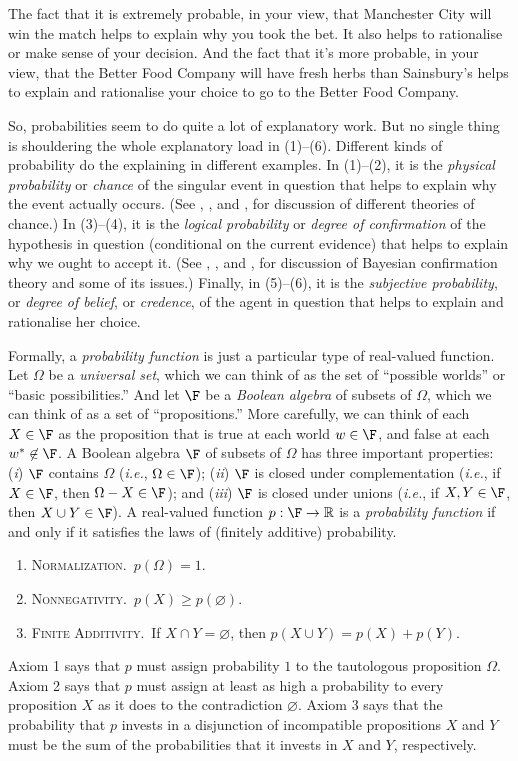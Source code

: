 The fact that it is extremely probable, in your view, that Manchester City will win the match helps to explain why you took the bet. It also helps to rationalise or make sense of your decision. And the fact that it's more probable, in your view, that the Better Food Company will have fresh herbs than Sainsbury's helps to explain and rationalise your choice to go to the Better Food Company.

So, probabilities seem to do quite a lot of explanatory work. But no single thing is shouldering the whole explanatory load in (1)--(6). Different kinds of probability do the explaining in different examples. In (1)--(2), it is the \emph{physical probability} or \emph{chance} of the singular event in question that helps to explain why the event actually occurs. (See \citealp{Hajek2009b}, \citealp{Gillies2000}, and \citealp{Hitchcock2012}, for discussion of different theories of chance.) In (3)--(4), it is the \emph{logical probability} or \emph{degree of confirmation} of the hypothesis in question (conditional on the current evidence) that helps to explain why we ought to accept it. (See \citealp{Earman1992}, \citealp{Hajek2008:konek}, and \citealp{Paris2011}, for discussion of Bayesian confirmation theory and some of its issues.) Finally, in (5)--(6), it is the \emph{subjective probability}, or \emph{degree of belief}, or \emph{credence}, of the agent in question that helps to explain and rationalise her choice.

Formally, a \emph{probability function} is just a particular type of real-valued function. Let $\Omega$ be a \emph{universal set}, which we can think of as the set of ``possible worlds'' or ``basic possibilities.'' And let $\F$ be a \emph{Boolean algebra} of subsets of $\Omega$, which we can think of as a set of ``propositions.'' More carefully, we can think of each $X\in\F$ as the proposition that is true at each world $w\in\F$, and false at each $w^*\not\in\F$. A Boolean algebra $\F$ of subsets of $\Omega$ has three important properties: (\emph{i}) $\F$ contains $\Omega$ (\emph{i.e.}, $\Omega\in\F$); (\emph{ii}) $\F$ is closed under complementation (\emph{i.e.}, if $X\in\F$, then $\Omega-X\in\F$); and (\emph{iii}) $\F$ is closed under unions (\emph{i.e.}, if $X,Y\in\F$, then $X\cup Y\in\F$). A real-valued function $p:\F\rightarrow\mathbb{R}$ is a \emph{probability function} if and only if it satisfies the laws of (finitely additive) probability.
\begin{enumerate}
\item\textsc{Normalization.}\, $p(\Omega)=1$.
\item\textsc{Nonnegativity.}\, $p(X)\geq p(\varnothing)$.
\item\textsc{Finite Additivity.}\, If $X\cap Y=\varnothing$, then $p(X\cup Y)=p(X)+p(Y)$.
\end{enumerate}
Axiom 1 says that $p$ must assign probability $1$ to the tautologous proposition $\Omega$. Axiom 2 says that $p$ must assign at least as high a probability to every proposition $X$ as it does to the contradiction $\varnothing$. Axiom 3 says that the probability that $p$ invests in a disjunction of incompatible propositions $X$ and $Y$ must be the sum of the probabilities that it invests in $X$ and $Y$, respectively.

